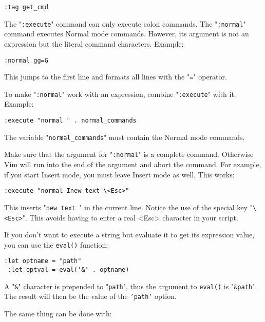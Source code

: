 \begin{Verbatim}[samepage=true]
 :tag get_cmd
\end{Verbatim}

The "\texttt{:execute}" command can only execute colon commands.
The "\texttt{:normal}" command executes Normal mode commands.
However, its argument is not an expression but the literal command characters.
Example:

\begin{Verbatim}[samepage=true]
 :normal gg=G
\end{Verbatim}

This jumps to the first line and formats all lines with the "\texttt{=}" operator.

To make "\texttt{:normal}" work with an expression, combine "\texttt{:execute}" with it.
Example:

\begin{Verbatim}[samepage=true]
 :execute "normal " . normal_commands
\end{Verbatim}

The variable "\texttt{normal\_commands}" must contain the Normal mode commands.

Make sure that the argument for "\texttt{:normal}" is a complete command.
Otherwise Vim will run into the end of the argument and abort the command.
For example, if you start Insert mode, you must leave Insert mode as well.
This works:

\begin{Verbatim}[samepage=true]
 :execute "normal Inew text \<Esc>"
\end{Verbatim}

This inserts "\texttt{new text }" in the current line.
Notice the use of the special key "\texttt{\textbackslash{}<Esc>}".
This avoids having to enter a real <Esc> character in your script.

If you don't want to execute a string but evaluate it to get its expression value, you can use the \texttt{eval()} function:

\begin{Verbatim}[samepage=true]
 :let optname = "path"
 :let optval = eval('&' . optname)
\end{Verbatim}

A "\texttt{\&}" character is prepended to "\texttt{path}", thus the argument to \texttt{eval()} is "\texttt{\&path}".
The result will then be the value of the \texttt{'path'} option.

The same thing can be done with:

